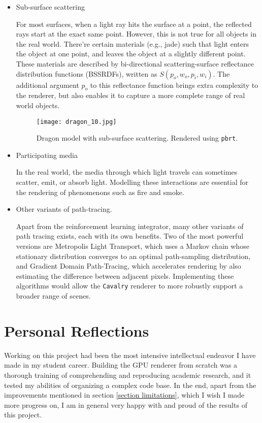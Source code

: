 \begin{itemize}

    \item Sub-surface scattering
    
    For most surfaces, when a light ray hits the surface at a point, the reflected rays start at the exact same point. However, this is not true for all objects in the real world. There're certain materials (e.g., jade) such that light enters the object at one point, and leaves the object at a slightly different point. These materials are described by bi-directional scattering-surface reflectance distribution functions (BSSRDFs), written as $S(p_o,w_o,p_i,w_i)$. The additional argument $p_o$ to this reflectance function brings extra complexity to the renderer, but also enables it to capture a more complete range of real world objects.

    \begin{figure}[H]
        \centering
        \texttt{[image: dragon\_10.jpg]}
        \caption{Dragon model with sub-surface scattering. Rendered using \texttt{pbrt}.}
    \end{figure}

    \item Participating media
    
    In the real world, the media through which light travels can sometimes scatter, emit, or absorb light. Modelling these interactions are essential for the rendering of phenomenons such as fire and smoke. 

    

    \item Other variants of path-tracing.
    
    Apart from the reinforcement learning integrator, many other variants of path tracing exists, each with its own benefits. Two of the most powerful versions are Metropolis Light Transport, which uses a Markov chain whose stationary distribution converges to an optimal path-sampling distribution, and Gradient Domain Path-Tracing, which accelerates rendering by also estimating the difference between adjacent pixels. Implementing these algorithms would allow the \texttt{Cavalry} renderer to more robustly support a broader range of scenes.


\end{itemize}



\section{Personal Reflections}
Working on this project had been the most intensive intellectual endeavor I have made in my student career. Building the GPU renderer from scratch was a thorough training of comprehending and reproducing academic research, and it tested my abilities of organizing a complex code base. In the end, apart from the improvements mentioned in section \ref{section limitations}, which I wish I made more progress on, I am in general very happy with and proud of the results of this project.

